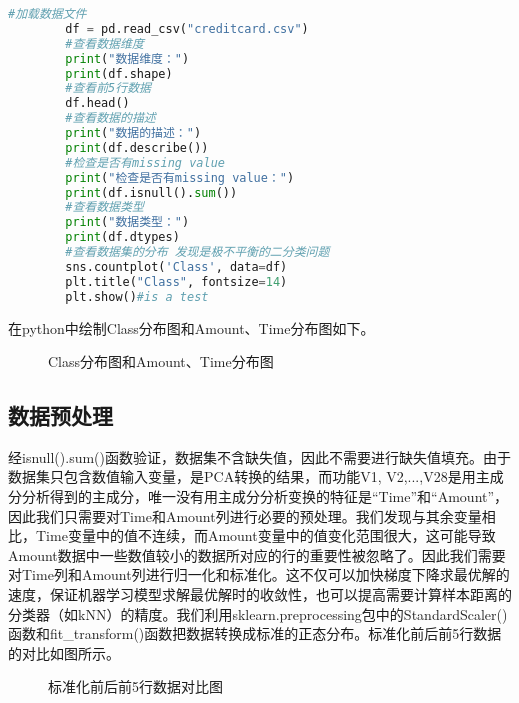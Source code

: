 \documentclass[a4paper,12pt]{article}
\begin{document}
	\begin{lstlisting}[language=python, breaklines]
		#加载数据文件
		df = pd.read_csv("creditcard.csv")
		#查看数据维度
		print("数据维度：")
		print(df.shape)
		#查看前5行数据
		df.head()
		#查看数据的描述
		print("数据的描述：")
		print(df.describe())
		#检查是否有missing value
		print("检查是否有missing value：")
		print(df.isnull().sum())
		#查看数据类型
		print("数据类型：")
		print(df.dtypes)
		#查看数据集的分布 发现是极不平衡的二分类问题
		sns.countplot('Class', data=df)
		plt.title("Class", fontsize=14)
		plt.show()#is a test
	\end{lstlisting}
	
	\newpage
	在python中绘制Class分布图和Amount、Time分布图如下。
	
	\begin{figure*}[ht]%
		\centering
		\subfloat[Class分布图]{\texttt{[image: q21]}}
		\hfill 	
		\caption{Class分布图和Amount、Time分布图}
	\end{figure*}
	\subsection{数据预处理}
	
	经isnull().sum()函数验证，数据集不含缺失值，因此不需要进行缺失值填充。由于数据集只包含数值输入变量，是PCA转换的结果，而功能V1, V2,...,V28是用主成分分析得到的主成分，唯一没有用主成分分析变换的特征是“Time”和“Amount”，因此我们只需要对Time和Amount列进行必要的预处理。我们发现与其余变量相比，Time变量中的值不连续，而Amount变量中的值变化范围很大，这可能导致Amount数据中一些数值较小的数据所对应的行的重要性被忽略了。因此我们需要对Time列和Amount列进行归一化和标准化。这不仅可以加快梯度下降求最优解的速度，保证机器学习模型求解最优解时的收敛性，也可以提高需要计算样本距离的分类器（如kNN）的精度。我们利用sklearn.preprocessing包中的StandardScaler()函数和fit\_transform()函数把数据转换成标准的正态分布。标准化前后前5行数据的对比如图所示。	
	\begin{figure*}[h]%
		\centering%
		\subfloat{\texttt{[image: q23]}}
		\hfill
		\centering
		\subfloat{\texttt{[image: q24]}}
			\caption{标准化前后前5行数据对比图}
	\end{figure*}
\end{document}
